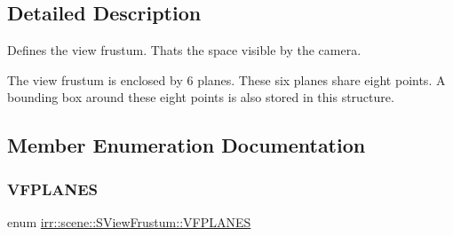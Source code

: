 \subsection{Detailed Description}
Defines the view frustum. That\textquotesingle{}s the space visible by the camera. 

The view frustum is enclosed by 6 planes. These six planes share eight points. A bounding box around these eight points is also stored in this structure. 

\subsection{Member Enumeration Documentation}
\mbox{\label{structirr_1_1scene_1_1SViewFrustum_ae3a96797aec028717f0589e82926b9f0}} 
\subsubsection{\texorpdfstring{V\+F\+P\+L\+A\+N\+ES}{VFPLANES}}
{\footnotesize\ttfamily enum \hyperlink{structirr_1_1scene_1_1SViewFrustum_ae3a96797aec028717f0589e82926b9f0}{irr\+::scene\+::\+S\+View\+Frustum\+::\+V\+F\+P\+L\+A\+N\+ES}}

